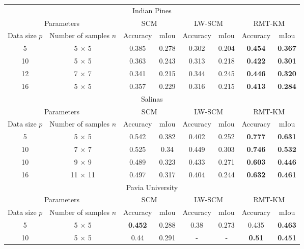 \begin{table*}
\centering
\begin{tabular}{|c | c || c | c||c | c||c | c||} 
\hline
 \multicolumn{8}{|c|}{Indian Pines} \\

\multicolumn{2}{|c|}{Parameters} & \multicolumn{2}{|c||}{SCM} & \multicolumn{2}{|c||}{LW-SCM} & \multicolumn{2}{|c|}{RMT-KM} \\ [0.5ex] 
\hline
Data size $p$ & Number of samples $n$ & Accuracy & mIou & Accuracy & mIou & Accuracy & mIou \\ [0.5ex] 
\hline\hline
5 & 5 $\times$ 5 & 0.385 & 0.278 & 0.302 & 0.204 & {\bf 0.454} & {\bf 0.367} \\ 
10 & 5 $\times$ 5 & 0.363 & 0.243 & 0.313 & 0.218 & {\bf 0.422} & {\bf 0.301} \\ 
12 & 7 $\times$ 7 & 0.341 & 0.215 & 0.344 & 0.245 & {\bf 0.446} & {\bf 0.320} \\ 
16 & 5 $\times$ 5 & 0.357 & 0.229 & 0.316 & 0.215 & {\bf 0.413} & {\bf 0.284} \\ 
\hline
\multicolumn{8}{|c|}{Salinas} \\
\hline
\multicolumn{2}{|c|}{Parameters} & \multicolumn{2}{|c||}{SCM} & \multicolumn{2}{|c||}{LW-SCM} & \multicolumn{2}{|c|}{RMT-KM} \\ [0.5ex] 
\hline
Data size $p$ & Number of samples $n$ & Accuracy & mIou & Accuracy & mIou & Accuracy & mIou \\ [0.5ex] 
\hline\hline
5 & 5 $\times$ 5 & 0.542 & 0.382 & 0.402 & 0.252 & {\bf 0.777} & {\bf 0.631} \\ 
10 & 7 $\times$ 7 & 0.525 & 0.34 & 0.449 & 0.303 & {\bf 0.746} & {\bf 0.532} \\ 
10 & 9 $\times$ 9 & 0.489 & 0.323 & 0.433 & 0.271 & {\bf 0.603} & {\bf 0.446} \\ 
16 & 11 $\times$ 11 & 0.497 & 0.317 & 0.404 & 0.244 & {\bf 0.632} & {\bf 0.461}\\
\hline 
\multicolumn{8}{|c|}{Pavia University} \\
\hline
\multicolumn{2}{|c|}{Parameters} & \multicolumn{2}{|c||}{SCM} & \multicolumn{2}{|c||}{LW-SCM} & \multicolumn{2}{|c|}{RMT-KM} \\ [0.5ex] 
\hline
Data size $p$ & Number of samples $n$ & Accuracy & mIou & Accuracy & mIou & Accuracy & mIou \\ [0.5ex] 
\hline
5 & 5 $\times$ 5 & {\bf 0.452} & 0.288 & 0.38 & 0.273 & 0.435 & {\bf 0.463} \\ 
10 & 5 $\times$ 5 & 0.44 & 0.291 & - & - & {\bf 0.51} & {\bf 0.451} \\ 

\end{tabular}
\end{table*}
